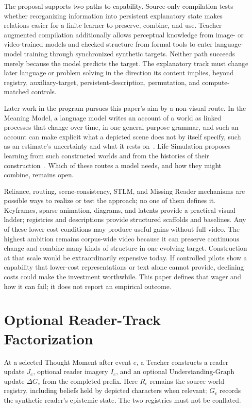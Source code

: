 \documentclass[11pt]{article}
\begin{document}
The proposal supports two paths to capability. Source-only compilation tests whether reorganizing information into persistent explanatory state makes relations easier for a finite learner to preserve, combine, and use. Teacher-augmented compilation additionally allows perceptual knowledge from image- or video-trained models and checked structure from formal tools to enter language-model training through synchronized synthetic targets. Neither path succeeds merely because the model predicts the target. The explanatory track must change later language or problem solving in the direction its content implies, beyond registry, auxiliary-target, persistent-description, permutation, and compute-matched controls.

Later work in the program pursues this paper's aim by a non-visual route. In the Meaning Model, a language model writes an account of a world as linked processes that change over time, in one general-purpose grammar, and such an account can make explicit what a depicted scene does not by itself specify, such as an estimate's uncertainty and what it rests on~\cite{westerberg2026meaning}. Life Simulation proposes learning from such constructed worlds and from the histories of their construction~\cite{westerberg2026lifesim}. Which of these routes a model needs, and how they might combine, remains open.

Reliance, routing, scene-consistency, STLM, and Missing Reader mechanisms are possible ways to realize or test the approach; no one of them defines it. Keyframes, sparse animation, diagrams, and latents provide a practical visual ladder; registries and descriptions provide structured scaffolds and baselines. Any of these lower-cost conditions may produce useful gains without full video. The highest ambition remains corpus-wide video because it can preserve continuous change and combine many kinds of structure in one evolving target. Construction at that scale would be extraordinarily expensive today. If controlled pilots show a capability that lower-cost representations or text alone cannot provide, declining costs could make the investment worthwhile. This paper defines that wager and how it can fail; it does not report an empirical outcome.

\appendix
\section{Optional Reader-Track Factorization}
\label{app:reader-factorization}

At a selected Thought Moment after event $e$, a Teacher constructs a reader update $J_e$, optional reader imagery $I_e$, and an optional Understanding-Graph update $\Delta G_e$ from the completed prefix. Here $R_e$ remains the source-world registry, including beliefs held by depicted characters when relevant; $G_e$ records the synthetic reader's epistemic state. The two registries must not be conflated.
\end{document}
